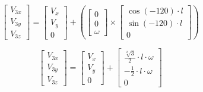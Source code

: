 \documentclass[answers]{exam}
\begin{document}
\begin{questions}
\begin{solution}
            \begin{equation*}
                \begin{bmatrix}
                    V_{3x} \\
                    V_{3y} \\
                    V_{3z}
                \end{bmatrix}
                = \begin{bmatrix}
                    V_x \\
                    V_y \\
                    0
                \end{bmatrix}
                + \left(\begin{bmatrix}
                    0 \\
                    0 \\
                    \omega
                \end{bmatrix} \times \begin{bmatrix}
                    \cos(- 120) \cdot l \\
                    \sin(- 120) \cdot l \\
                    0
                \end{bmatrix}\right)
            \end{equation*}

            \begin{equation*}
                \begin{bmatrix}
                    V_{3x} \\
                    V_{3y} \\
                    V_{3z}
                \end{bmatrix}
                = \begin{bmatrix}
                    V_x \\
                    V_y \\
                    0
                \end{bmatrix}
                + \begin{bmatrix}
                    \frac{\sqrt[2]{3}}{2} \cdot l \cdot \omega \\
                    - \frac{1}{2} \cdot l \cdot \omega         \\
                    0
                \end{bmatrix}
            \end{equation*}


\end{solution}
\end{questions}
\end{document}
